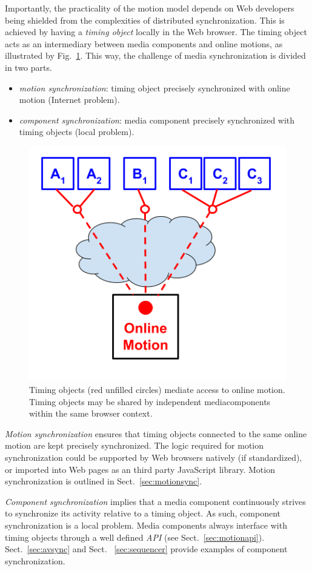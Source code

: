 Importantly, the practicality of the motion model depends on Web developers
being shielded from the complexities of distributed synchronization. This is
achieved by having a \emph{timing object} locally in the Web browser. The
timing object acts as an intermediary between media components and online
motions, as illustrated by Fig.~\ref{fig:model-2}. This way, the challenge of
media synchronization is divided in two parts.

\begin{itemize}
\item{\emph{motion synchronization}: timing object precisely synchronized with online motion (Internet problem).}
\item{\emph{component synchronization}: media component precisely synchronized with timing objects (local problem).} 
\end{itemize}


\begin{figure}[h]
\centering
\includegraphics[scale=.4]{fig/motion-model-2.png}
\caption{Timing objects (red unfilled circles) mediate access to online motion. Timing objects may be shared by independent mediacomponents within the same browser context.}
\label{fig:model-2}
\end{figure}

\emph{Motion synchronization} ensures that timing objects connected to the
same online motion are kept precisely synchronized. The logic required for
motion synchronization could be supported by Web browsers natively (if
standardized), or imported into Web pages as an third party JavaScript
library. Motion synchronization is outlined in Sect.~\ref{sec:motionsync}.

\emph{Component synchronization} implies that a media component continuously
strives to synchronize its activity relative to a timing object. As such,
component synchronization is a local problem. Media components always
interface with timing objects through a well defined \emph{API} (see
Sect.~\ref{sec:motionapi}). Sect.~\ref{sec:avsync} and Sect.
~\ref{sec:sequencer} provide examples of component synchronization.

